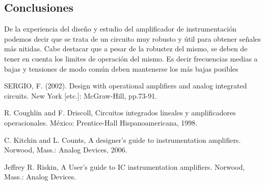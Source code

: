 \subsection{Conclusiones}

De la experiencia del diseño y estudio del amplificador de instrumentación podemos decir que se trata de un circuito muy robusto y útil para obtener señales más nitidas. Cabe destacar que a pesar de la robustez del mismo, se deben de tener en cuenta los limites de operación del mismo. Es decir frecuencias medias a bajas y tensiones de modo común deben mantenerse los más bajas posibles
 	
\begin{thebibliography}{9}
	
	SERGIO, F. (2002). Design with operational amplifiers and analog integrated circuits. New York [etc.]: McGraw-Hill, pp.73-91.	
	
	R. Coughlin and F. Driscoll, Circuitos integrados lineales y amplificadores operacionales. México: Prentice-Hall Hispanoamericana, 1998.
	
	C. Kitchin and L. Counts, A designer's guide to instrumentation amplifiers. Norwood, Mass.: Analog Devices, 2006.
	
	Jeffrey R. Riskin, A User's guide to IC instrumentation amplifiers. Norwood, Mass.: Analog Devices.
	
\end{thebibliography}
